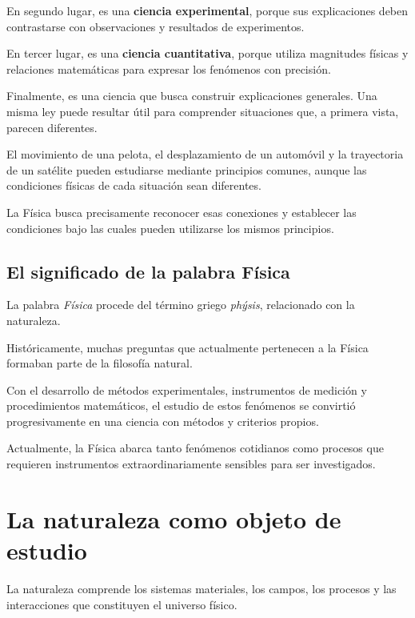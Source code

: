 En segundo lugar, es una \textbf{ciencia experimental},
porque sus explicaciones deben contrastarse con observaciones
y resultados de experimentos.

En tercer lugar, es una \textbf{ciencia cuantitativa},
porque utiliza magnitudes físicas y relaciones matemáticas
para expresar los fenómenos con precisión.

Finalmente, es una ciencia que busca construir explicaciones
generales. Una misma ley puede resultar útil para comprender
situaciones que, a primera vista, parecen diferentes.

\begin{idea}

El movimiento de una pelota, el desplazamiento de un automóvil
y la trayectoria de un satélite pueden estudiarse mediante
principios comunes, aunque las condiciones físicas de cada
situación sean diferentes.

La Física busca precisamente reconocer esas conexiones
y establecer las condiciones bajo las cuales pueden utilizarse
los mismos principios.

\end{idea}


\subsection{El significado de la palabra Física}

La palabra \emph{Física} procede del término griego
\emph{phýsis}, relacionado con la naturaleza.

Históricamente, muchas preguntas que actualmente pertenecen
a la Física formaban parte de la filosofía natural.

Con el desarrollo de métodos experimentales, instrumentos
de medición y procedimientos matemáticos, el estudio de
estos fenómenos se convirtió progresivamente en una ciencia
con métodos y criterios propios.

Actualmente, la Física abarca tanto fenómenos cotidianos
como procesos que requieren instrumentos extraordinariamente
sensibles para ser investigados.


\section{La naturaleza como objeto de estudio}

La naturaleza comprende los sistemas materiales, los campos,
los procesos y las interacciones que constituyen el universo
físico.

